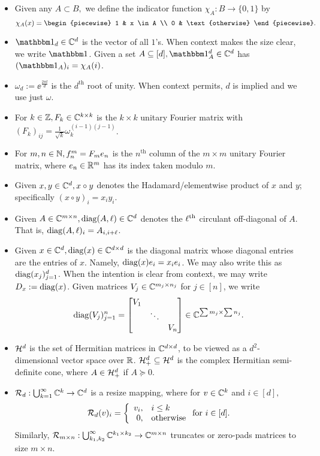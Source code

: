 \begin{itemize}
  \item Given any $A \subset B,$ we define the indicator function $\chi_A : B \to \{0, 1\}$ by \[\chi_A(x) = \begin{piecewise} 1 & x \in A \\ 0 & \text{otherwise} \end{piecewise}.\]
  \item $\one_d \in \C^d$ is the vector of all $1$'s.  When context makes the size clear, we write $\one$.  Given a set $A \subset [d], \one_A^d \in \C^d$ has $(\one_A)_i = \chi_A(i)$.
\item $\omega_d := \ee^{\frac{2 \pi \ii}{d}}$ is the $d^{\text{th}}$ root of unity.  When context permits, $d$ is implied and we use just $\omega$.
\item For $k \in \mathbb{Z}, F_k \in \mathbb{C}^{k \times k}$ is the $k \times k$ unitary Fourier matrix with $(F_k)_{ij} = \frac{1}{\sqrt{k}} \omega_k^{(i-1)(j-1)}$.
  \item For $m, n \in \mathbb{N}, f_n^m = F_m e_n$ is the $n^{\text{th}}$ column of the $m \times m$ unitary Fourier matrix, where $e_n \in \mathbb{R}^m$ has its index taken modulo $m$.
\item Given $x, y \in \mathbb{C}^d, x \circ y$ denotes the Hadamard/elementwise product of $x$ and $y$; specifically $(x \circ y)_i = x_i y_i$.
\item Given $A \in \mathbb{C}^{m \times n}, \operatorname{diag}(A, \ell) \in \mathbb{C}^d$ denotes the $\ell^{\text{th}}$ circulant off-diagonal of $A$.  That is, $\operatorname{diag}(A, \ell)_i = A_{i, i + \ell}$.
\item Given $x \in \mathbb{C}^d, \operatorname{diag}(x) \in \mathbb{C}^{d \times d}$ is the diagonal matrix whose diagonal entries are the entries of $x$.  Namely, $\operatorname{diag}(x) e_i = x_i e_i$.  We may also write this as $\operatorname{diag}(x_j)_{j = 1}^d$.  When the intention is clear from context, we may write $D_x := \operatorname{diag}(x)$.  Given matrices $V_j \in \mathbb{C}^{m_j \times n_j}$ for $j \in [n]$, we write \[\operatorname{diag}(V_j)_{j = 1}^n = \begin{bmatrix} V_1 & & \\ & \ddots & \\ & & V_n \end{bmatrix} \in \mathbb{C}^{\sum m_j \times \sum n_j}.\]
  \item $\mathcal{H}^d$ is the set of Hermitian matrices in $\mathbb{C}^{d \times d}$, to be viewed as a $d^2$-dimensional vector space over $\mathbb{R}$.  $\mathcal{H}^d_+ \subseteq \mathcal{H}^d$ is the complex Hermitian semi-definite cone, where $A \in \mathcal{H}^d_+$ if $A \succeq 0$.
  \item $\mathcal{R}_d : \bigcup_{k = 1}^\infty \mathbb{C}^k \to \mathbb{C}^d$ is a resize mapping, where for $v \in \mathbb{C}^k$ and $i \in [d],$ $$\mathcal{R}_d(v)_i = \left\{\begin{array}{r@{,\quad}l} v_i & i \le k \\ 0 & \text{otherwise} \end{array}\right. \text{for}\ i \in [d].$$  Similarly, $\mathcal{R}_{m \times n} : \bigcup_{k_1, k_2}^\infty \mathbb{C}^{k_1 \times k_2} \to \mathbb{C}^{m \times n}$ truncates or zero-pads matrices to size $m \times n.$

\end{itemize}
